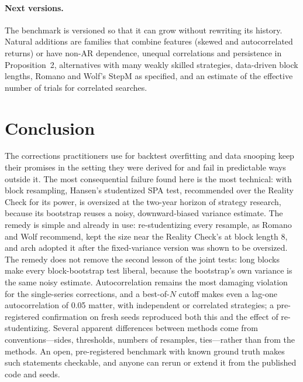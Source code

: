 \paragraph{Next versions.} The benchmark is versioned so that it can grow without rewriting its history. Natural additions are families that combine features (skewed and autocorrelated returns) or have non-AR dependence, unequal correlations and persistence in Proposition~2, alternatives with many weakly skilled strategies, data-driven block lengths, Romano and Wolf's StepM as specified, and an estimate of the effective number of trials for correlated searches.

\section{Conclusion}
\label{sec:conclusion}
The corrections practitioners use for backtest overfitting and data snooping keep their promises in the setting they were derived for and fail in predictable ways outside it. The most consequential failure found here is the most technical: with block resampling, Hansen's studentized SPA test, recommended over the Reality Check for its power, is oversized at the two-year horizon of strategy research, because its bootstrap reuses a noisy, downward-biased variance estimate. The remedy is simple and already in use: re-studentizing every resample, as Romano and Wolf recommend, kept the size near the Reality Check's at block length 8, and arch adopted it after the fixed-variance version was shown to be oversized. The remedy does not remove the second lesson of the joint tests: long blocks make every block-bootstrap test liberal, because the bootstrap's own variance is the same noisy estimate. Autocorrelation remains the most damaging violation for the single-series corrections, and a best-of-$N$ cutoff makes even a lag-one autocorrelation of 0.05 matter, with independent or correlated strategies; a pre-registered confirmation on fresh seeds reproduced both this and the effect of re-studentizing. Several apparent differences between methods come from conventions---sides, thresholds, numbers of resamples, ties---rather than from the methods. An open, pre-registered benchmark with known ground truth makes such statements checkable, and anyone can rerun or extend it from the published code and seeds.
